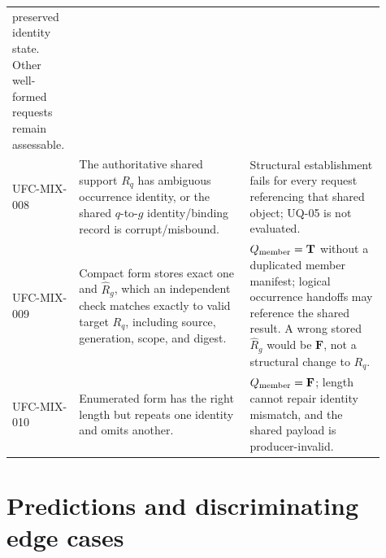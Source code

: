 \begin{longtable}{p{0.14\linewidth}p{0.43\linewidth}p{0.34\linewidth}}
preserved identity state. Other well-formed requests remain assessable.\\
UFC-MIX-008 & The authoritative shared support \(R_q\) has ambiguous
occurrence identity, or the shared \(q\)-to-\(g\) identity/binding record is
corrupt/misbound. &
Structural establishment fails for every request referencing that shared
object; UQ-05 is not evaluated.\\
UFC-MIX-009 & Compact form stores exact one and \(\widehat R_g\), which an
independent check matches exactly to valid target \(R_q\), including source,
generation, scope, and digest. & \(Q_{\rm member}=\mathbf T\) without a
duplicated member manifest; logical occurrence handoffs may reference the
shared result. A wrong stored \(\widehat R_g\) would be \(\mathbf F\), not a
structural change to \(R_q\).\\
UFC-MIX-010 & Enumerated form has the right length but repeats one identity and
omits another. & \(Q_{\rm member}=\mathbf F\); length cannot repair identity
mismatch, and the shared payload is producer-invalid.\\
\bottomrule
\end{longtable}

\section{Predictions and discriminating edge cases}


